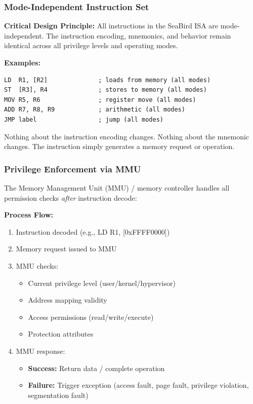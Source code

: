 \documentclass[12pt]{article}
\begin{document}
\subsubsection{Mode-Independent Instruction Set}

\textbf{Critical Design Principle:} All instructions in the SeaBird ISA are mode-independent. The instruction encoding, mnemonics, and behavior remain identical across all privilege levels and operating modes.

\textbf{Examples:}

\begin{lstlisting}
LD  R1, [R2]              ; loads from memory (all modes)
ST  [R3], R4              ; stores to memory (all modes)
MOV R5, R6                ; register move (all modes)
ADD R7, R8, R9            ; arithmetic (all modes)
JMP label                 ; jump (all modes)
\end{lstlisting}

Nothing about the instruction encoding changes. Nothing about the mnemonic changes. The instruction simply generates a memory request or operation.

\subsubsection{Privilege Enforcement via MMU}

The Memory Management Unit (MMU) / memory controller handles all permission checks \textit{after} instruction decode:

\textbf{Process Flow:}

\begin{enumerate}
    \item Instruction decoded (e.g., LD R1, [0xFFFF0000])
    \item Memory request issued to MMU
    \item MMU checks:
    \begin{itemize}
        \item Current privilege level (user/kernel/hypervisor)
        \item Address mapping validity
        \item Access permissions (read/write/execute)
        \item Protection attributes
    \end{itemize}
    \item MMU response:
    \begin{itemize}
        \item \textbf{Success:} Return data / complete operation
        \item \textbf{Failure:} Trigger exception (access fault, page fault, privilege violation, segmentation fault)
    \end{itemize}
\end{enumerate}
\end{document}
